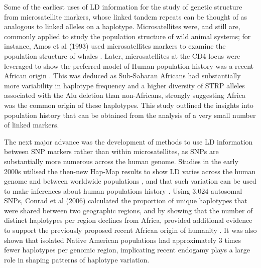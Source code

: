 Some of the earliest uses of LD information for the study of genetic structure from microsatellite markers, whose linked tandem repeats can be thought of as analogous to linked alleles on a haplotype. Microsatellites were, and still are, commonly applied to study the population structure of wild animal systems; for instance, Amos et al (1993) used microsatellites markers to examine the population structure of whales \cite{amos1993social}. Later, microsatellites at the CD4 locus were leveraged to show the preferred model of Human population history was a recent African origin \cite{tishkoff1996global}. This was deduced as Sub-Saharan Africans had substantially more variability in haplotype frequency and a higher diversity of STRP alleles associated with the Alu deletion than non-Africans, strongly suggesting Africa was the common origin of these haplotypes. This study outlined the insights into population history that can be obtained from the analysis of a very small number of linked markers.  

The next major advance was the development of methods to use LD information between SNP markers rather than within microsatellites, as SNPs are substantially more numerous across the human genome. Studies in the early 2000s utilised the then-new Hap-Map results \cite{gibbs2003international} to show LD varies across the human genome \cite{crawford2004evidence} and between worldwide populations \cite{evans2005comparison, reich2001linkage}, and that such variation can be used to make inferences about human populations history \cite{conrad2006worldwide}. Using 3,024 autosomal SNPs, Conrad et al (2006) calculated the proportion of unique haplotypes that were shared between two geographic regions, and by showing that the number of distinct haplotypes per region declines from Africa, provided additional evidence to support the previously proposed recent African origin of humanity \cite{cann1987mitochondrial}. It was also shown that isolated Native American populations had approximately 3 times fewer haplotypes per genomic region, implicating recent endogamy plays a large role in shaping patterns of haplotype variation. 
 

